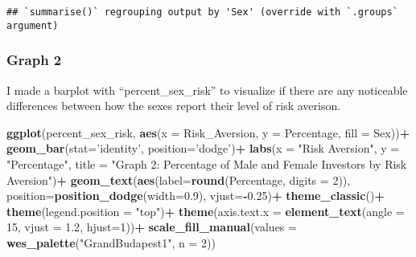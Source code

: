 \documentclass[
]{article}
\newenvironment{Shaded}{\begin{snugshade}}{\end{snugshade}}
\newcommand{\DataTypeTok}[1]{\textcolor[rgb]{0.13,0.29,0.53}{#1}}
\newcommand{\DecValTok}[1]{\textcolor[rgb]{0.00,0.00,0.81}{#1}}
\newcommand{\FloatTok}[1]{\textcolor[rgb]{0.00,0.00,0.81}{#1}}
\newcommand{\KeywordTok}[1]{\textcolor[rgb]{0.13,0.29,0.53}{\textbf{#1}}}
\newcommand{\NormalTok}[1]{#1}
\newcommand{\OperatorTok}[1]{\textcolor[rgb]{0.81,0.36,0.00}{\textbf{#1}}}
\newcommand{\StringTok}[1]{\textcolor[rgb]{0.31,0.60,0.02}{#1}}
\begin{document}
\begin{verbatim}
## `summarise()` regrouping output by 'Sex' (override with `.groups` argument)
\end{verbatim}

\hypertarget{graph-2}{%
\subsubsection{Graph 2}\label{graph-2}}

I made a barplot with ``percent\_sex\_risk'' to visualize if there are
any noticeable differences between how the sexes report their level of
risk averison.

\begin{Shaded}
\begin{Highlighting}[]
\KeywordTok{ggplot}\NormalTok{(percent_sex_risk, }\KeywordTok{aes}\NormalTok{(}\DataTypeTok{x =}\NormalTok{ Risk_Aversion, }\DataTypeTok{y =}\NormalTok{ Percentage, }\DataTypeTok{fill =}\NormalTok{ Sex))}\OperatorTok{+}\StringTok{ }
\StringTok{  }\KeywordTok{geom_bar}\NormalTok{(}\DataTypeTok{stat=}\StringTok{'identity'}\NormalTok{, }\DataTypeTok{position=}\StringTok{'dodge'}\NormalTok{)}\OperatorTok{+}
\StringTok{  }\KeywordTok{labs}\NormalTok{(}\DataTypeTok{x =} \StringTok{"Risk Aversion"}\NormalTok{, }\DataTypeTok{y =} \StringTok{"Percentage"}\NormalTok{, }\DataTypeTok{title =} \StringTok{"Graph 2: Percentage of Male and Female Investors by Risk Aversion"}\NormalTok{)}\OperatorTok{+}\StringTok{   }
\StringTok{  }\KeywordTok{geom_text}\NormalTok{(}\KeywordTok{aes}\NormalTok{(}\DataTypeTok{label=}\KeywordTok{round}\NormalTok{(Percentage, }\DataTypeTok{digits =} \DecValTok{2}\NormalTok{)), }\DataTypeTok{position=}\KeywordTok{position_dodge}\NormalTok{(}\DataTypeTok{width=}\FloatTok{0.9}\NormalTok{), }\DataTypeTok{vjust=}\OperatorTok{-}\FloatTok{0.25}\NormalTok{)}\OperatorTok{+}
\StringTok{  }\KeywordTok{theme_classic}\NormalTok{()}\OperatorTok{+}
\StringTok{  }\KeywordTok{theme}\NormalTok{(}\DataTypeTok{legend.position =} \StringTok{"top"}\NormalTok{)}\OperatorTok{+}
\StringTok{  }\KeywordTok{theme}\NormalTok{(}\DataTypeTok{axis.text.x =} \KeywordTok{element_text}\NormalTok{(}\DataTypeTok{angle =} \DecValTok{15}\NormalTok{, }\DataTypeTok{vjust =} \FloatTok{1.2}\NormalTok{, }\DataTypeTok{hjust=}\DecValTok{1}\NormalTok{))}\OperatorTok{+}\StringTok{ }
\StringTok{  }\KeywordTok{scale_fill_manual}\NormalTok{(}\DataTypeTok{values =} \KeywordTok{wes_palette}\NormalTok{(}\StringTok{"GrandBudapest1"}\NormalTok{, }\DataTypeTok{n =} \DecValTok{2}\NormalTok{))}
\end{Highlighting}
\end{Shaded}
\end{document}
